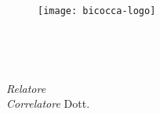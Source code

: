 \begin{titlepage}
    \begin{center}
        \begin{LARGE}
            \textbf{\myUni}\\
        \end{LARGE}

        \vspace{10pt}

        \begin{large}
            \textsc{\myDepartment}\\
        \end{large}

        \vspace{10pt}

        \begin{Large}
            \textsc{\myFaculty}\\
        \end{Large}

        \vspace{30pt}
        \begin{figure}[htbp]
            \centering
            \texttt{[image: bicocca-logo]}
        \end{figure}
        \vspace{30pt}

        \begin{LARGE}
            \textbf{\myTitle}\\
        \end{LARGE}

        \vspace{10pt}

        \begin{large}
            \textsl{\myDegree}\\
        \end{large}

        \vspace{60pt}

        \begin{large}
            \begin{flushleft}
                \textit{Relatore} \profTitle\ \myProf\\
                \vspace{10pt}
                \textit{Correlatore} Dott. \coProf\\
                
            \end{flushleft}


\end{large}
\end{center}
\end{titlepage}
